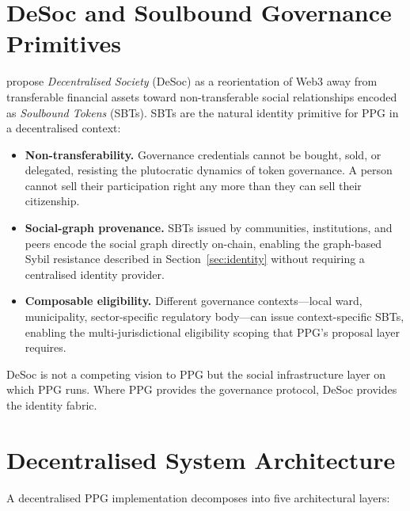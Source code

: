 \documentclass[12pt,a4paper,oneside]{report}
\begin{document}
\section{DeSoc and Soulbound Governance Primitives}

\citet{buterin2022desoc} propose \emph{Decentralised Society} (DeSoc) as a reorientation of Web3 away from transferable financial assets toward non-transferable social relationships encoded as \emph{Soulbound Tokens} (SBTs). SBTs are the natural identity primitive for PPG in a decentralised context:

\begin{itemize}
  \item \textbf{Non-transferability.} Governance credentials cannot be bought, sold, or delegated, resisting the plutocratic dynamics of token governance. A person cannot sell their participation right any more than they can sell their citizenship.
  \item \textbf{Social-graph provenance.} SBTs issued by communities, institutions, and peers encode the social graph directly on-chain, enabling the graph-based Sybil resistance described in Section~\ref{sec:identity} without requiring a centralised identity provider.
  \item \textbf{Composable eligibility.} Different governance contexts---local ward, municipality, sector-specific regulatory body---can issue context-specific SBTs, enabling the multi-jurisdictional eligibility scoping that PPG's proposal layer requires.
\end{itemize}

DeSoc is not a competing vision to PPG but the social infrastructure layer on which PPG runs. Where PPG provides the governance protocol, DeSoc provides the identity fabric.

\section{Decentralised System Architecture}

A decentralised PPG implementation decomposes into five architectural layers:
\end{document}
